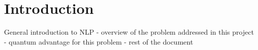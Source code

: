 \section{Introduction}
\label{sec:introduction}
General introduction to NLP - overview of the problem addressed in this project - quantum advantage for this problem - rest of the document